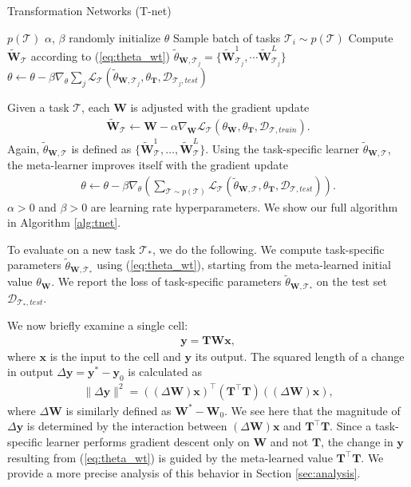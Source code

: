 \documentclass{article}
\newcommand{\calD}{{\mathcal{D}}}
\newcommand{\calT}{{\mathcal{T}}}
\newcommand{\0}{{\bf 0}}
\newcommand{\be}{\begin{eqnarray}}
\newcommand{\ee}{\end{eqnarray}}
\newcommand{\bee}{\begin{eqnarray*}}
\newcommand{\eee}{\end{eqnarray*}}
\newcommand{\x}{\mathbf{x}}
\newcommand{\y}{\mathbf{y}}
\newcommand{\W}{\mathbf{W}}
\newcommand{\T}{\mathbf{T}}
\newcommand{\loss}{\mathcal{L}_{\calT}}
\begin{document}
\begin{algorithm}[t]
\caption{Transformation Networks (T-net)}
\label{alg:tnet}
\begin{algorithmic}[1]
\REQUIRE $p(\mathcal{T})$
\REQUIRE $\alpha$, $\beta$
\STATE randomly initialize $\theta$
    \STATE Sample batch of tasks $ \mathcal{T}_i \sim p(\mathcal{T})$ 
        	\STATE Compute $\widetilde{\W}_{\calT}$ according to (\ref{eq:theta_wt})
\ENDFOR
        \STATE $\widetilde{\theta}_{\W, \calT_j} = \{ \widetilde{\W}^{1}_{\calT_j}, \cdots \widetilde{\W}^{L}_{\calT_j} \}$
    \ENDFOR
    \STATE $\theta \leftarrow \theta - \beta \nabla_{\theta} \sum_{j} \loss (\widetilde{\theta}_{\W,\calT_j}, \theta_{\T},\calD_{\calT_j,test})$
\ENDWHILE
\end{algorithmic}
\end{algorithm}

 Given a task $\calT$, each $\W$ is adjusted with the gradient update
\be
\label{eq:theta_wt}
\widetilde{\W}_{\calT} \leftarrow \W - \alpha \nabla_{\W} 
\loss \left(\theta_{\W}, \theta_{\T},\calD_{\calT,train} \right).
\ee
Again, $\widetilde{\theta}_{\W,\calT}$ is defined as $\{\widetilde{\W}_{\calT}^1, \ldots, \widetilde{\W}_{\calT}^L \}$.
Using the task-specific learner $\widetilde{\theta}_{\W,\calT}$, the meta-learner improves itself with the gradient update
\be
\label{eq:theta}
\theta  \leftarrow \theta - \beta \nabla_{\theta}
 \left( \sum_{\calT \sim p(\calT)} \loss \left(\widetilde{\theta}_{\W,\calT}, \theta_{\T},\calD_{\calT,test} \right) \right).
\ee
$\alpha > 0$ and $\beta > 0$ are learning rate hyperparameters.
We show our full algorithm in Algorithm \ref{alg:tnet}.

To evaluate on a new task $\calT_{\ast}$, we do the following.
We compute task-specific parameters $\widetilde{\theta}_{\W,\calT_{\ast}}$ using (\ref{eq:theta_wt}),
starting from the meta-learned initial value $\theta_{\W}$.
We report the loss of task-specific parameters $\widetilde{\theta}_{\W,\calT_{\ast}}$ on the test set $\calD_{\calT_{\ast},test}$.

We now briefly examine a single cell:
\bee
\y = \T \W \x,
\eee
where $\x$ is the input to the cell and $\y$ its output.
The squared length of a change in output $\Delta \y = \y^*-\y_0$ is calculated as
\be
\| \Delta \y \|^2 = \left( (\Delta \W) \x \right)^{\top} \left( \T^{\top} \T \right) \left( (\Delta \W) \x \right),
\ee
where $\Delta \W$ is similarly defined as $\W^*-\W_0$.
We see here that the magnitude of $\Delta \y$ is determined by the interaction between $(\Delta \W) \x$ and $\T^\top \T$.
Since a task-specific learner performs gradient descent only on $\W$ and not $\T$, the change in $\y$ resulting from (\ref{eq:theta_wt})
is guided by the meta-learned value $\T^\top \T$.
We provide a more precise analysis of this behavior in Section \ref{sec:analysis}.
\end{document}
